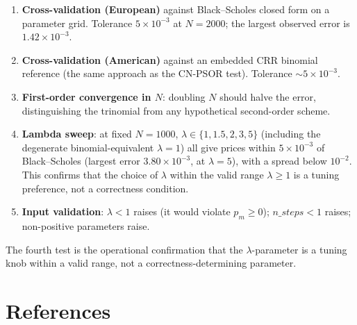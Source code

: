 \documentclass[11pt,a4paper]{article}
\begin{document}
\begin{enumerate}[leftmargin=2em]
\item \textbf{Cross-validation (European)} against Black--Scholes
closed form on a parameter grid. Tolerance $5 \times 10^{-3}$ at
$N = 2000$; the largest observed error is $1.42\times10^{-3}$.

\item \textbf{Cross-validation (American)} against an embedded
CRR binomial reference (the same approach as the CN-PSOR test). Tolerance
$\sim 5 \times 10^{-3}$.

\item \textbf{First-order convergence in $N$}: doubling $N$ should
halve the error, distinguishing the trinomial from any
hypothetical second-order scheme.

\item \textbf{Lambda sweep}: at fixed $N = 1000$, $\lambda \in
\{1, 1.5, 2, 3, 5\}$ (including the degenerate binomial-equivalent
$\lambda = 1$) all give prices within $5\times10^{-3}$ of Black--Scholes
(largest error $3.80\times10^{-3}$, at $\lambda = 5$), with a spread
below $10^{-2}$. This confirms that the choice of $\lambda$
within the valid range $\lambda \ge 1$ is a tuning preference,
not a correctness condition.

\item \textbf{Input validation}: $\lambda < 1$ raises (it would
violate $p_m \ge 0$); $n\_steps < 1$ raises; non-positive parameters
raise.
\end{enumerate}

The fourth test is the operational confirmation that the
$\lambda$-parameter is a tuning knob within a valid range, not a
correctness-determining parameter.

\section*{References}
\end{document}
